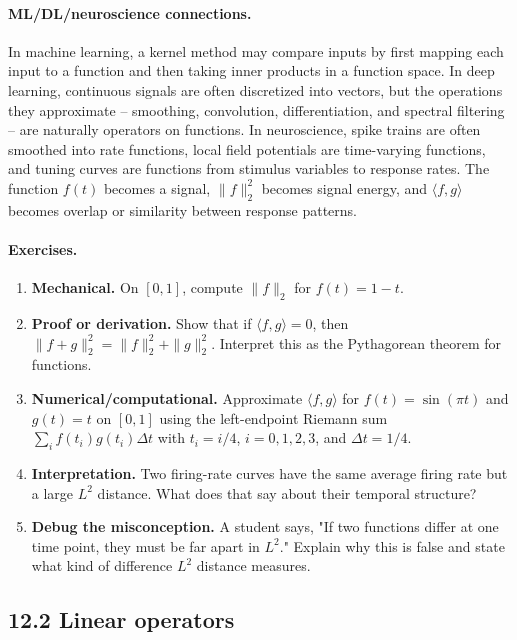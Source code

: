 \paragraph{ML/DL/neuroscience connections.}
In machine learning, a kernel method may compare inputs by first mapping each input to a function and then taking inner products in a function space. In deep learning, continuous signals are often discretized into vectors, but the operations they approximate -- smoothing, convolution, differentiation, and spectral filtering -- are naturally operators on functions. In neuroscience, spike trains are often smoothed into rate functions, local field potentials are time-varying functions, and tuning curves are functions from stimulus variables to response rates. The function \(f(t)\) becomes a signal, \(\|f\|_2^2\) becomes signal energy, and \(\langle f,g\rangle\) becomes overlap or similarity between response patterns.

\paragraph{Exercises.}
\begin{enumerate}[label=\textbf{12.1.\arabic*.}, leftmargin=*]
\item \textbf{Mechanical.} On \([0,1]\), compute \(\|f\|_2\) for \(f(t)=1-t\).
\item \textbf{Proof or derivation.} Show that if \(\langle f,g\rangle=0\), then \(\|f+g\|_2^2=\|f\|_2^2+\|g\|_2^2\). Interpret this as the Pythagorean theorem for functions.
\item \textbf{Numerical/computational.} Approximate \(\langle f,g\rangle\) for \(f(t)=\sin(\pi t)\) and \(g(t)=t\) on \([0,1]\) using the left-endpoint Riemann sum \(\sum_i f(t_i)g(t_i)\Delta t\) with \(t_i=i/4\), \(i=0,1,2,3\), and \(\Delta t=1/4\).
\item \textbf{Interpretation.} Two firing-rate curves have the same average firing rate but a large \(L^2\) distance. What does that say about their temporal structure?
\item \textbf{Debug the misconception.} A student says, "If two functions differ at one time point, they must be far apart in \(L^2\)." Explain why this is false and state what kind of difference \(L^2\) distance measures.
\end{enumerate}

\subsection{12.2 Linear operators}

